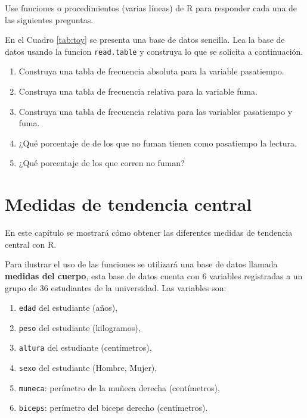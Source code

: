 \documentclass[
]{book}
\providecommand{\tightlist}{%
  \setlength{\itemsep}{0pt}\setlength{\parskip}{0pt}}
\begin{document}
Use funciones o procedimientos (varias líneas) de R para responder cada una de las siguientes preguntas.

En el Cuadro \ref{tab:toy} se presenta una base de datos sencilla. Lea la base de datos usando la funcion \texttt{read.table} y construya lo que se solicita a continuación.

\begin{enumerate}
\def\labelenumi{\arabic{enumi}.}
\tightlist
\item
  Construya una tabla de frecuencia absoluta para la variable pasatiempo.
\item
  Construya una tabla de frecuencia relativa para la variable fuma.
\item
  Construya una tabla de frecuencia relativa para las variables pasatiempo y fuma.
\item
  ¿Qué porcentaje de de los que no fuman tienen como pasatiempo la lectura.
\item
  ¿Qué porcentaje de los que corren no fuman?
\end{enumerate}

\hypertarget{central}{%
\chapter{Medidas de tendencia central}\label{central}}

En este capítulo se mostrará cómo obtener las diferentes medidas de tendencia central con R.

Para ilustrar el uso de las funciones se utilizará una base de datos llamada \textbf{medidas del cuerpo}, esta base de datos cuenta con 6 variables registradas a un grupo de 36 estudiantes de la universidad. Las variables son:

\begin{enumerate}
\def\labelenumi{\arabic{enumi}.}
\tightlist
\item
  \texttt{edad} del estudiante (años),
\item
  \texttt{peso} del estudiante (kilogramos),
\item
  \texttt{altura} del estudiante (centímetros),
\item
  \texttt{sexo} del estudiante (Hombre, Mujer),
\item
  \texttt{muneca}: perímetro de la muñeca derecha (centímetros),
\item
  \texttt{biceps}: perímetro del biceps derecho (centímetros).
\end{enumerate}
\end{document}
